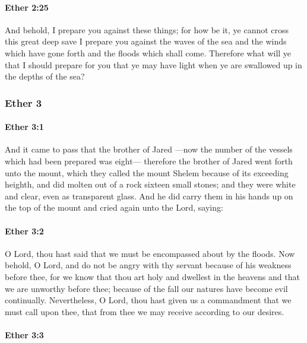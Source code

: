 		\paragraph{Ether 2:25} %
			\label{ETHER-2-25}

			And behold, I prepare you against these things;
			for how be it, ye cannot cross this great deep
			save I prepare you against the waves of the sea
			and the winds which have gone forth
			and the floods which shall come.
			Therefore what will ye that I should prepare for you
			that ye may have light when ye are swallowed up in the depths of the sea?

	\subsubsection{Ether 3} %
		\label{ETHER-3}
		
		\paragraph{Ether 3:1} %
			\label{ETHER-3-1}

			And it came to pass that the brother of Jared
			---now the number of the vessels which had been prepared was eight---
			therefore the brother of Jared went forth unto the mount,
			which they called the mount Shelem because of its exceeding heighth,
			and did molten out of a rock sixteen small stones;
			and they were white and clear, even as transparent glass.
			And he did carry them in his hands up on the top of the mount
			and cried again unto the Lord, saying:

		\paragraph{Ether 3:2} %
			\label{ETHER-3-2}

			O Lord, thou hast said that we must be encompassed about by the floods.
			Now behold, O Lord, and do not be angry with thy servant
			because of his weakness before thee,
			for we know that thou art holy and dwellest in the heavens
			and that we are unworthy before thee;
			because of the fall our natures have become evil continually.
			Nevertheless, O Lord, thou hast given us a commandment
			that we must call upon thee,
			that from thee we may receive according to our desires.

		\paragraph{Ether 3:3} %
			\label{ETHER-3-3}

